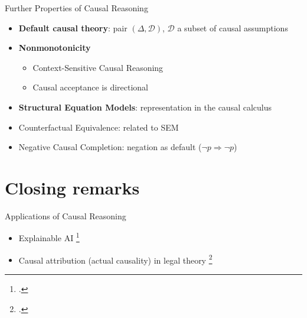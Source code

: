 \documentclass{beamer} %
\begin{document}
\begin{frame}{Further Properties of Causal Reasoning}

    \begin{itemize} 
        \item \textbf{Default causal theory}: pair $(\Delta, \mathcal{D})$, $\mathcal{D}$ a subset of causal assumptions
        \item \textbf{Nonmonotonicity}
        \begin{itemize}
            \item Context-Sensitive Causal Reasoning
            \item Causal acceptance is directional
        \end{itemize}
        \item \textbf{Structural Equation Models}: representation in the causal calculus
        \item Counterfactual Equivalence: related to SEM
        \item Negative Causal Completion: negation as default ($ \neg p \Rightarrow \neg p$)
    \end{itemize}

\end{frame}






\section{Closing remarks}
\begin{frame}{Applications of Causal Reasoning}
    \begin{itemize}
        \item Explainable AI \footcite{bochman_causal_2024}
        \item Causal attribution (actual causality) in legal theory \footcite{bochman_actual_2018}
    \end{itemize}
\end{frame}
\end{document}
